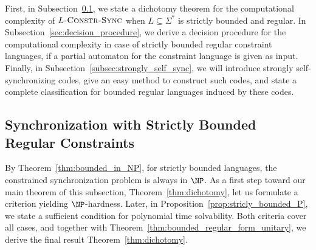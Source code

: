 
First, in Subsection~\ref{sec:constrained_sync_strictly_bounded},
we state a dichotomy
theorem for the computational complexity of $L\textsc{-Constr-Sync}$
when $L \subseteq \Sigma^*$ is  strictly bounded and regular.
In Subsection~\ref{sec:decision_procedure},
we derive a decision procedure for the computational complexity
in case of strictly bounded regular constraint languages,
if a partial automaton for the constraint language is given as input.
Finally, in Subsection~\ref{subsec:strongly_self_sync},
we will introduce strongly self-synchronizing codes, give an easy method
to construct such codes, and state a complete classification
for bounded regular languages induced by these codes.

\subsection{Synchronization with Strictly Bounded Regular Constraints}
\label{sec:constrained_sync_strictly_bounded}

By Theorem~\ref{thm:bounded_in_NP}, for strictly bounded languages, the constrained
synchronization problem is always in $\NP$. As a first step toward
our main theorem of this subsection, Theorem~\ref{thm:dichotomy},
let us formulate 
a criterion yielding $\NP$-hardness. Later, in Proposition~\ref{prop:stricly_bounded_P},
we state a sufficient condition for polynomial time solvability. 
Both criteria cover all cases, and together
with Theorem~\ref{thm:bounded_regular_form_unitary}, we derive
the final result Theorem~\ref{thm:dichotomy}.


